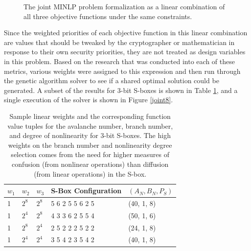 \documentclass[11pt]{article}
\begin{document}
\begin{figure}
\centering
{}
\label{jointProblem}
\caption{The joint MINLP problem formalization as a linear combination of all three objective functions under the same constraints.}
\end{figure}

Since the weighted priorities of each objective function in this linear combination are values that should be tweaked by the cryptographer or mathematician in response to their own security priorities, they are not treated as design variables in this problem. Based on the research that was conducted into each of these metrics, various weights were assigned to this expression and then run through the genetic algorithm solver to see if a shared optimal solution could be generated. A subset of the results for $3$-bit S-boxes is shown in Table \ref{jointTable}, and a single execution of the solver is shown in Figure \ref{joint8}.

\begin{table}
	\centering
	\caption{Sample linear weights and the corresponding function value tuples for the avalanche number, branch number, and degree of nonlinearity for $3$-bit S-boxes. The high weights on the branch number and nonlinearity degree selection comes from the need for higher measures of confusion (from nonlinear operations) than diffusion (from linear operations) in the S-box.}
	\label{jointTable}
    \begin{tabular}{|l|l|l|l|l|}
        \hline
        $w_1$ & $w_2$ & $w_3$ & S-Box Configuration & $(A_N, B_N, P_S)$ \\ \hline
        1 & $2^8$ & $2^8$ & 5     6     2     5     5     6     2     5 & (40, 1, 8) \\ 
        1 & $2^4$ & $2^8$ & 4     3     3     6     2     5     5     4 & (50, 1, 6) \\ 
        1 & $2^8$ & $2^4$ & 2     5     2     2     2     5     2     2 & (24, 1, 8) \\ 
        1 & $2^4$ & $2^4$ & 3     5     4     2     3     5     4     2 & (40, 1, 8) \\ 
        \hline
    \end{tabular}
\end{table}
\end{document}
